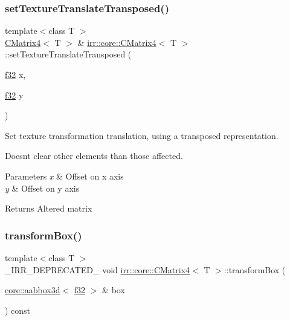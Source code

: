\subsubsection{\texorpdfstring{set\+Texture\+Translate\+Transposed()}{setTextureTranslateTransposed()}}
{\footnotesize\ttfamily template$<$class T $>$ \\
\hyperlink{classirr_1_1core_1_1CMatrix4}{C\+Matrix4}$<$ T $>$ \& \hyperlink{classirr_1_1core_1_1CMatrix4}{irr\+::core\+::\+C\+Matrix4}$<$ T $>$\+::set\+Texture\+Translate\+Transposed (\begin{DoxyParamCaption}\item[{\hyperlink{namespaceirr_a0277be98d67dc26ff93b1a6a1d086b07}{f32}}]{x,  }\item[{\hyperlink{namespaceirr_a0277be98d67dc26ff93b1a6a1d086b07}{f32}}]{y }\end{DoxyParamCaption})\hspace{0.3cm}{\ttfamily [inline]}}



Set texture transformation translation, using a transposed representation. 

Doesn\textquotesingle{}t clear other elements than those affected. 
\begin{DoxyParams}{Parameters}
{\em x} & Offset on x axis \\
\hline
{\em y} & Offset on y axis \\
\hline
\end{DoxyParams}
\begin{DoxyReturn}{Returns}
Altered matrix 
\end{DoxyReturn}
\mbox{\label{classirr_1_1core_1_1CMatrix4_a0e6a0a3b1b20aac7313806fdb1a01316}} 
\subsubsection{\texorpdfstring{transform\+Box()}{transformBox()}}
{\footnotesize\ttfamily template$<$class T $>$ \\
\+\_\+\+I\+R\+R\+\_\+\+D\+E\+P\+R\+E\+C\+A\+T\+E\+D\+\_\+ void \hyperlink{classirr_1_1core_1_1CMatrix4}{irr\+::core\+::\+C\+Matrix4}$<$ T $>$\+::transform\+Box (\begin{DoxyParamCaption}\item[{\hyperlink{classirr_1_1core_1_1aabbox3d}{core\+::aabbox3d}$<$ \hyperlink{namespaceirr_a0277be98d67dc26ff93b1a6a1d086b07}{f32} $>$ \&}]{box }\end{DoxyParamCaption}) const\hspace{0.3cm}{\ttfamily [inline]}}



